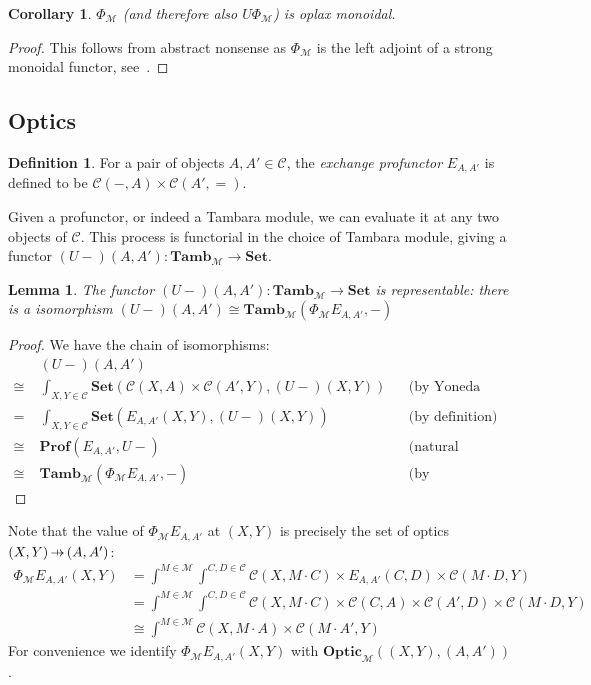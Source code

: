 \documentclass[11pt,letterpaper]{article}
\theoremstyle{plain}
\newtheorem{lemma}[theorem]{Lemma}
\newtheorem{corollary}[theorem]{Corollary}
\theoremstyle{definition}
\newtheorem{definition}[theorem]{Definition}
\newcommand{\C}{\mathscr{C}}
\newcommand{\M}{\mathscr{M}}
\newcommand{\Pastro}{\Phi}
\newcommand{\Set}{\mathbf{Set}}
\newcommand{\Prof}{\mathbf{Prof}}
\newcommand{\Tamb}{\mathbf{Tamb}}
\newcommand{\Optic}{\mathbf{Optic}}
\newcommand{\act}{\cdot}
\newcommand{\hto}{\ensuremath{\,\mathaccent\shortmid\rightarrow\,}}
\begin{document}
\begin{corollary}
  $\Pastro_\M$ (and therefore also $U \Pastro_\M$) is oplax monoidal.
\end{corollary}
\begin{proof}
  This follows from abstract nonsense as $\Pastro_\M$ is the left adjoint of a strong monoidal functor, see~\cite{Kelly1974}.
\end{proof}

\subsection{Optics}
\begin{definition}
  For a pair of objects $A, A' \in \C$, the \emph{exchange profunctor} $E_{A, A'}$ is defined to be $\C(-, A) \times \C(A', {=})$.
\end{definition}

Given a profunctor, or indeed a Tambara module, we can evaluate it at any two objects of $\C$. This process is functorial in the choice of Tambara module, giving a functor $(U-)(A,A') : \Tamb_\M \to \Set$.

\begin{lemma}\label{lemma-rep}
  The functor $(U-)(A,A') : \Tamb_\M \to \Set$ is representable: there is a isomorphism $(U-)(A,A') \cong \Tamb_\M(\Pastro_\M E_{A, A'}, -)$
\end{lemma}
\begin{proof}
  We have the chain of isomorphisms:
  \begin{align*}
    &(U-)(A,A') \\
    \cong \;&\int_{X,Y \in \C} \Set(\C(X,A) \times \C(A',Y), (U-)(X,Y)) && \text{(by Yoneda reduction twice)} \\
    =\;&\int_{X,Y \in \C} \Set(E_{A, A'}(X,Y), (U-)(X,Y)) && \text{(by definition)}\\
    \cong \;&\Prof(E_{A, A'}, U-) && \text{(natural transformations as ends)} \\
    \cong \;&\Tamb_\M(\Pastro_\M E_{A, A'}, -) && \text{(by adjointness)}
  \end{align*}
\end{proof}

Note that the value of $\Pastro_\M E_{A, A'}$ at $(X,Y)$ is precisely the set of optics $(X, Y) \hto (A, A')$:
\begin{align*}
\Pastro_\M E_{A, A'} (X, Y)
&= \int^{M \in \M} \int^{C,D \in \C} \C(X, M\act C) \times E_{A, A'}(C,D) \times  \C(M\act D, Y) \\
&= \int^{M \in \M} \int^{C,D \in \C} \C(X, M\act C) \times \C(C, A) \times \C(A', D) \times \C(M\act D, Y) \\
&\cong \int^{M \in \M} \C(X, M\act A) \times \C(M\act A', Y)
\end{align*}
For convenience we identify $\Pastro_\M E_{A, A'}(X,Y)$ with $\Optic_\M((X, Y), (A, A'))$.
\end{document}
